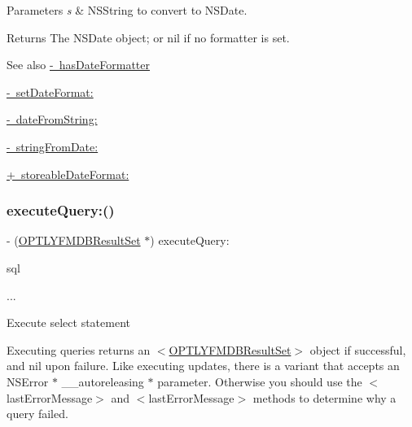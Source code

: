 \begin{DoxyParams}{Parameters}
{\em s} & {\ttfamily N\+S\+String} to convert to {\ttfamily N\+S\+Date}.\\
\hline
\end{DoxyParams}
\begin{DoxyReturn}{Returns}
The {\ttfamily N\+S\+Date} object; or {\ttfamily nil} if no formatter is set.
\end{DoxyReturn}
\begin{DoxySeeAlso}{See also}
\mbox{\hyperlink{interface_o_p_t_l_y_f_m_d_b_database_a820a1ababb4c5496800b9bcd5f2de784}{-\/ has\+Date\+Formatter}} 

\mbox{\hyperlink{interface_o_p_t_l_y_f_m_d_b_database_a48c1936bc68ddd11cea9aa177b0cc94e}{-\/ set\+Date\+Format\+:}} 

\mbox{\hyperlink{interface_o_p_t_l_y_f_m_d_b_database_a5368268fe8e6d881d0da4d3538607768}{-\/ date\+From\+String\+:}} 

\mbox{\hyperlink{interface_o_p_t_l_y_f_m_d_b_database_a60793c2b214e29c00143fdf9510837d7}{-\/ string\+From\+Date\+:}} 

\mbox{\hyperlink{interface_o_p_t_l_y_f_m_d_b_database_acb3eef48cd21dcb11407b88dac662c57}{+ storeable\+Date\+Format\+:}} 
\end{DoxySeeAlso}
\mbox{\label{interface_o_p_t_l_y_f_m_d_b_database_ad749b1bd0f19dc48b36867d1622d201a}} 
\subsubsection{\texorpdfstring{execute\+Query\+:()}{executeQuery:()}}
{\footnotesize\ttfamily -\/ (\mbox{\hyperlink{interface_o_p_t_l_y_f_m_d_b_result_set}{O\+P\+T\+L\+Y\+F\+M\+D\+B\+Result\+Set}} $\ast$) execute\+Query\+: \begin{DoxyParamCaption}\item[{(N\+S\+String$\ast$)}]{sql }\item[{,}]{... }\end{DoxyParamCaption}}

Execute select statement

Executing queries returns an {\ttfamily $<$\mbox{\hyperlink{interface_o_p_t_l_y_f_m_d_b_result_set}{O\+P\+T\+L\+Y\+F\+M\+D\+B\+Result\+Set}}$>$} object if successful, and {\ttfamily nil} upon failure. Like executing updates, there is a variant that accepts an {\ttfamily N\+S\+Error $\ast$ \+\_\+\+\_\+autoreleasing $\ast$} parameter. Otherwise you should use the {\ttfamily $<$last\+Error\+Message$>$} and {\ttfamily $<$last\+Error\+Message$>$} methods to determine why a query failed.

